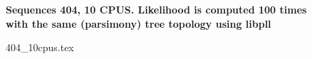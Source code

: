 \documentclass[12pt,a4paper]{article}
\begin{document}
\newcommand*{\figuretitle}[1]{%
    {\centering%
    \textbf{#1}%
    \par\medskip}%
}

\begin{figure}
\figuretitle{Sequences 404, 10 CPUS. Likelihood is computed 100 times with the same (parsimony) tree topology using libpll}
{404_10cpus.tex}
\end{figure}
\end{document}

